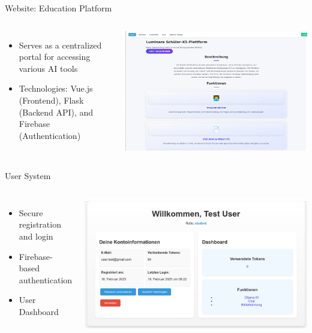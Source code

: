 \documentclass{beamer}
\begin{document}
\begin{frame}{Website: Education Platform}
  \begin{columns}
      \begin{itemize}
        \item Serves as a centralized portal for accessing various AI tools
        \item Technologies: Vue.js (Frontend), Flask (Backend API), and Firebase (Authentication)
      \end{itemize}
      \centering
      \includegraphics[width=\textwidth]{homepage-screenshot.png}
  \end{columns}
\end{frame}

\begin{frame}{User System}
  \begin{columns}
      \begin{itemize}
        \item Secure registration and login
        \item Firebase-based authentication
        \item User Dashboard
      \end{itemize}
      \centering
      \includegraphics[width=\textwidth]{Account-Managment.png}
  \end{columns}
\end{frame}
\end{document}
